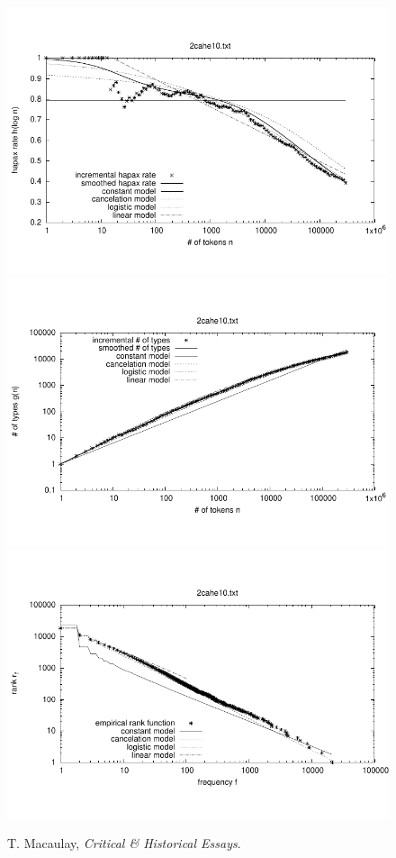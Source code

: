 \documentclass[a4paper,12pt]{article}
\begin{document}

\begin{figure}[p]
  \centering
  \vspace{-2em}
  \includegraphics[width=0.8\columnwidth]{output/herdan/2cahe10_27/token_ratio.pdf}
  \\[-3em]
  \includegraphics[width=0.8\columnwidth]{output/herdan/2cahe10_27/token_type.pdf}
  \\[-3em]
  \includegraphics[width=0.8\columnwidth]{output/herdan/2cahe10_27/frequency_rank.pdf}
  \vspace{-2em}
  \caption{T. Macaulay, \emph{Critical \& Historical
      Essays}.\label{fig2cahe10F}}
\end{figure}
\end{document}
